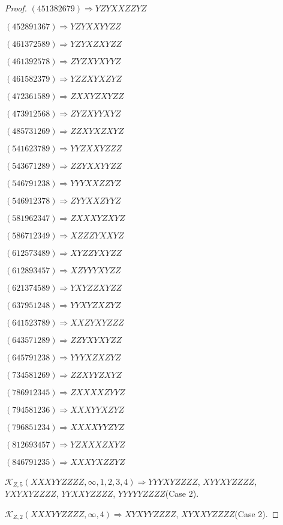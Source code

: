 \documentclass[12pt]{article}
\theoremstyle{plain}
\theoremstyle{definition}
\theoremstyle{remark}
\newcommand{\fancy}[1]{\mathcal{#1}}
\def\K{\fancy{K}}
\begin{document}
\begin{proof}
	$(4 5 1 3 8 2 6 7 9)\Rightarrow YZYXXZZYZ$
	
	$(4 5 2 8 9 1 3 6 7)\Rightarrow YZYXXYYZZ$
	
	$(4 6 1 3 7 2 5 8 9)\Rightarrow YZYXZXYZZ$
	
	$(4 6 1 3 9 2 5 7 8)\Rightarrow ZYZXYXYYZ$
	
	$(4 6 1 5 8 2 3 7 9)\Rightarrow YZZXYXZYZ$
	
	$(4 7 2 3 6 1 5 8 9)\Rightarrow ZXXYZXYZZ$
	
	$(4 7 3 9 1 2 5 6 8)\Rightarrow ZYZXYYXYZ$
	
	$(4 8 5 7 3 1 2 6 9)\Rightarrow ZZXYXZXYZ$
	
	$(5 4 1 6 2 3 7 8 9)\Rightarrow YYZXXYZZZ$
	
	$(5 4 3 6 7 1 2 8 9)\Rightarrow ZZYXXYYZZ$
	
	$(5 4 6 7 9 1 2 3 8)\Rightarrow YYYXXZZYZ$
	
	$(5 4 6 9 1 2 3 7 8)\Rightarrow ZYYXXZYYZ$
	
	$(5 8 1 9 6 2 3 4 7)\Rightarrow ZXXXYZXYZ$
	
	$(5 8 6 7 1 2 3 4 9)\Rightarrow XZZZYXXYZ$
	
	$(6 1 2 5 7 3 4 8 9)\Rightarrow XYZZYXYZZ$
	
	$(6 1 2 8 9 3 4 5 7)\Rightarrow XZYYYXYZZ$
	
	$(6 2 1 3 7 4 5 8 9)\Rightarrow YXYZZXYZZ$
	
	$(6 3 7 9 5 1 2 4 8)\Rightarrow YYXYZXZYZ$
	
	$(6 4 1 5 2 3 7 8 9)\Rightarrow XXZYXYZZZ$
	
	$(6 4 3 5 7 1 2 8 9)\Rightarrow ZZYXYXYZZ$
	
	$(6 4 5 7 9 1 2 3 8)\Rightarrow YYYXZXZYZ$
	
	$(7 3 4 5 8 1 2 6 9)\Rightarrow ZZXYYZXYZ$
	
	$(7 8 6 9 1 2 3 4 5)\Rightarrow ZXXXXZYYZ$
	
	$(7 9 4 5 8 1 2 3 6)\Rightarrow XXXYYXZYZ$
	
	$(7 9 6 8 5 1 2 3 4)\Rightarrow XXXXYYZYZ$
	
	$(8 1 2 6 9 3 4 5 7)\Rightarrow YZXXXZXYZ$
	
	$(8 4 6 7 9 1 2 3 5)\Rightarrow XXXYXZZYZ$
	
	
	
	$\K_{Z,5}(XXXYYZZZZ,\infty,1, 2, 3, 4)\Rightarrow $$YYYXYZZZZ$, $XYYXYZZZZ$, $YXYXYZZZZ$, $YYXXYZZZZ$, $YYYYYZZZZ$(Case 2).
	
	$\K_{Z,2}(XXXYYZZZZ,\infty,4)\Rightarrow $$XYXYYZZZZ$, $XYXXYZZZZ$(Case 2).
	

\end{proof}
\end{document}
